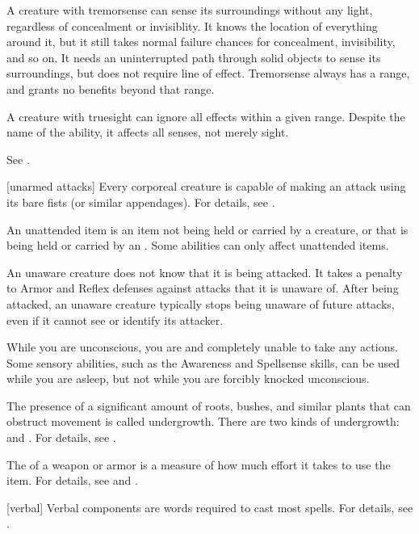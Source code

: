  A creature with tremorsense can sense its surroundings without any light, regardless of concealment or invisiblity.
It knows the location of everything around it, but it still takes normal failure chances for concealment, invisibility, and so on.
It needs an uninterrupted path through solid objects to sense its surroundings, but does not require line of effect.
Tremorsense always has a range, and grants no benefits beyond that range.

 A creature with truesight can ignore all  effects within a given range.
Despite the name of the ability, it affects all senses, not merely sight.

 See .

[unarmed attacks] Every corporeal creature is capable of making an attack using its bare fists (or similar appendages).
For details, see .

 An unattended item is an item not being held or carried by a creature, or that is being held or carried by an .
Some abilities can only affect unattended items.

 An unaware creature does not know that it is being attacked.
It takes a  penalty to Armor and Reflex defenses against attacks that it is unaware of.
After being attacked, an unaware creature typically stops being unaware of future attacks, even if it cannot see or identify its attacker.

 While you are unconscious, you are  and completely unable to take any actions.
Some sensory abilities, such as the Awareness and Spellsense skills, can be used while you are asleep, but not while you are forcibly knocked unconscious.

 The presence of a significant amount of roots, bushes, and similar plants that can obstruct movement is called undergrowth.
There are two kinds of undergrowth:  and .
For details, see .

 The  of a weapon or armor is a measure of how much effort it takes to use the item.
For details, see  and .

[verbal] Verbal components are words required to cast most spells.
For details, see .

